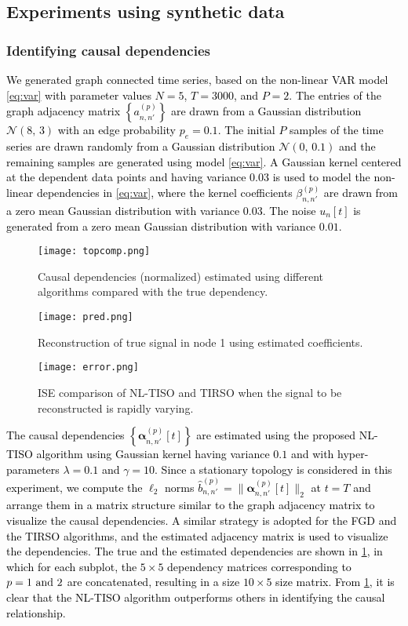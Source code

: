 \documentclass[conference]{IEEEtran}
\def\cbr#1{\left\lbrace #1 \right\rbrace}
\def\bs #1{\boldsymbol{#1}}
\newcommand{\cB}[1]{\textcolor{black}{#1}}
\def\p {{(p)}}
\def\n {{n'}}
\begin{document}
\subsection{Experiments using synthetic data}
\subsubsection{Identifying causal dependencies }
\label{Tid}
\cB{We generated graph connected time series, based on the non-linear VAR model \eqref{eq:var} with parameter values $N=5$, $T=3000$, and $P=2$. The entries of the graph adjacency matrix $\cbr{a_{n,\n}^\p}$ are drawn from a Gaussian distribution $\mathcal{N}(8,\,3)$ with an edge probability $p_e=0.1$. The initial $P$ samples of the time series are drawn randomly from a Gaussian distribution $\mathcal{N}(0,\,0.1)$ and the remaining samples are generated using model \eqref{eq:var}. A Gaussian kernel centered at the dependent data points and having variance 0.03 is used to model the non-linear dependencies in \eqref{eq:var}, where the kernel coefficients $\beta_{n,n'}^{(p)}$ are drawn from a zero mean Gaussian distribution with variance $0.03$. The noise $u_n[t]$ is generated from a zero mean Gaussian distribution with variance $0.01$. }
\begin{figure}[hbt!]
\centerline{\texttt{[image: topcomp.png]}}
\caption{Causal dependencies (normalized) estimated using different algorithms compared with the  true dependency.}
\label{topid}
\end{figure}
\begin{figure}[hbt!]
\centerline{\texttt{[image: pred.png]}}
\caption{Reconstruction of true signal in node 1 using estimated coefficients. }
\label{rec}
\end{figure}

\begin{figure}[hbt!]
\centerline{\texttt{[image: error.png]}}
\caption{ISE comparison of NL-TISO and TIRSO when the signal to be reconstructed is rapidly  varying.}
\label{error}
\end{figure}
\cB{The causal dependencies $\cbr{{\bs \alpha}_{n,\n}^{(p)}[t]}$ are estimated using the proposed NL-TISO algorithm using Gaussian kernel having variance $0.1$ and with hyper-parameters  $\lambda=0.1$ and $\gamma=10$. Since a stationary topology is considered in this experiment, we compute the $\ell_2$ norms $\widehat{b}_{n,n'}^\p=\|\bs{\alpha}_{n,n'}^\p[t]\|_2$ at $t=T$ and arrange them in a matrix structure similar to the graph adjacency matrix to visualize the causal dependencies. A similar strategy is adopted for the FGD and the TIRSO algorithms, and the estimated adjacency matrix is used to visualize the dependencies. The true and the estimated dependencies are shown in \cref{topid}, in which for each subplot, the $5\times5$ dependency matrices corresponding to $p=1 \rm{~and~}2$ are concatenated, resulting in a size $10\times 5$ size matrix. From \cref{topid}, it is clear that the NL-TISO algorithm outperforms others in identifying the causal relationship. }
\end{document}
